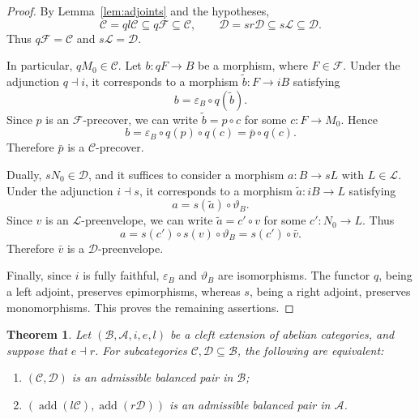 \documentclass[11pt]{amsart}
\newtheorem{theorem}{Theorem}[section]
\theoremstyle{definition}
\theoremstyle{remark}
\theoremstyle{plain}
\numberwithin{equation}{section}
\begin{document}
\begin{proof}
	By Lemma~\ref{lem:adjoints} and the hypotheses,
	\[
	\mathcal{C}=ql\mathcal{C}\subseteq q\mathcal{F}
	\subseteq\mathcal{C},
	\qquad
	\mathcal{D}=sr\mathcal{D}\subseteq s\mathcal{L}
	\subseteq\mathcal{D}.
	\]
	Thus $q\mathcal{F}=\mathcal{C}$ and
	$s\mathcal{L}=\mathcal{D}$.
	
	In particular, $qM_0\in\mathcal{C}$. Let $b:qF\to B$ be a morphism, where $F\in\mathcal{F}$. Under the adjunction $q\dashv i$, it corresponds to a morphism $\widetilde b:F\to iB$ satisfying
	\[
	b=\varepsilon_B\circ q(\widetilde b).
	\]
	Since $p$ is an $\mathcal{F}$-precover, we can write
	$\widetilde b=p\circ c$ for some $c:F\to M_0$. Hence
	\[
	b=\varepsilon_B\circ q(p)\circ q(c)
	=\bar p\circ q(c).
	\]
	Therefore $\bar p$ is a $\mathcal{C}$-precover.
	
	Dually, $sN_0\in\mathcal{D}$, and it suffices to consider a morphism $a:B\to sL$ with $L\in\mathcal{L}$. Under the adjunction $i\dashv s$, it corresponds to a morphism $\widetilde a:iB\to L$ satisfying
	\[
	a=s(\widetilde a)\circ\vartheta_B.
	\]
	Since $v$ is an $\mathcal{L}$-preenvelope, we can write $\widetilde a=c'\circ v$ for some $c':N_0\to L$. Thus
	\[
	a=s(c')\circ s(v)\circ\vartheta_B
	=s(c')\circ\bar v.
	\]
	Therefore $\bar v$ is a $\mathcal{D}$-preenvelope.
	
	Finally, since $i$ is fully faithful, $\varepsilon_B$ and $\vartheta_B$ are isomorphisms. The functor $q$, being a left adjoint, preserves epimorphisms, whereas
	$s$, being a right adjoint, preserves monomorphisms. This proves the remaining assertions.
\end{proof}


\begin{theorem}\label{thm:induced}
	Let $(\mathcal{B},\mathcal{A},i,e,l)$ be a cleft extension of abelian categories, and suppose that $e\dashv r$.
	For subcategories $\mathcal{C},\mathcal{D}\subseteq\mathcal{B}$,
	the following are equivalent:
	\begin{enumerate}
		\item $(\mathcal{C},\mathcal{D})$ is an admissible balanced
		pair in $\mathcal{B}$;
		\item $(\operatorname{add}(l\mathcal{C}),
		\operatorname{add}(r\mathcal{D}))$
		is an admissible balanced pair in $\mathcal{A}$.
	\end{enumerate}
\end{theorem}
\end{document}
